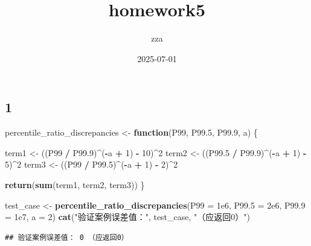 \documentclass[
]{article}
\title{homework5}
\author{zza}
\date{2025-07-01}
\newenvironment{Shaded}{\begin{snugshade}}{\end{snugshade}}
\newcommand{\AttributeTok}[1]{\textcolor[rgb]{0.13,0.29,0.53}{#1}}
\newcommand{\ControlFlowTok}[1]{\textcolor[rgb]{0.13,0.29,0.53}{\textbf{#1}}}
\newcommand{\DecValTok}[1]{\textcolor[rgb]{0.00,0.00,0.81}{#1}}
\newcommand{\FloatTok}[1]{\textcolor[rgb]{0.00,0.00,0.81}{#1}}
\newcommand{\FunctionTok}[1]{\textcolor[rgb]{0.13,0.29,0.53}{\textbf{#1}}}
\newcommand{\NormalTok}[1]{#1}
\newcommand{\OtherTok}[1]{\textcolor[rgb]{0.56,0.35,0.01}{#1}}
\newcommand{\SpecialCharTok}[1]{\textcolor[rgb]{0.81,0.36,0.00}{\textbf{#1}}}
\newcommand{\StringTok}[1]{\textcolor[rgb]{0.31,0.60,0.02}{#1}}
\begin{document}
\maketitle

\subsection{1}\label{section}

\begin{Shaded}
\begin{Highlighting}[]
\NormalTok{percentile\_ratio\_discrepancies }\OtherTok{\textless{}{-}} \ControlFlowTok{function}\NormalTok{(P99, P99}\FloatTok{.5}\NormalTok{, P99}\FloatTok{.9}\NormalTok{, a) \{}
  
\NormalTok{  term1 }\OtherTok{\textless{}{-}}\NormalTok{ ((P99 }\SpecialCharTok{/}\NormalTok{ P99}\FloatTok{.9}\NormalTok{)}\SpecialCharTok{\^{}}\NormalTok{(}\SpecialCharTok{{-}}\NormalTok{a }\SpecialCharTok{+} \DecValTok{1}\NormalTok{) }\SpecialCharTok{{-}} \DecValTok{10}\NormalTok{)}\SpecialCharTok{\^{}}\DecValTok{2}
\NormalTok{  term2 }\OtherTok{\textless{}{-}}\NormalTok{ ((P99}\FloatTok{.5} \SpecialCharTok{/}\NormalTok{ P99}\FloatTok{.9}\NormalTok{)}\SpecialCharTok{\^{}}\NormalTok{(}\SpecialCharTok{{-}}\NormalTok{a }\SpecialCharTok{+} \DecValTok{1}\NormalTok{) }\SpecialCharTok{{-}} \DecValTok{5}\NormalTok{)}\SpecialCharTok{\^{}}\DecValTok{2}
\NormalTok{  term3 }\OtherTok{\textless{}{-}}\NormalTok{ ((P99 }\SpecialCharTok{/}\NormalTok{ P99}\FloatTok{.5}\NormalTok{)}\SpecialCharTok{\^{}}\NormalTok{(}\SpecialCharTok{{-}}\NormalTok{a }\SpecialCharTok{+} \DecValTok{1}\NormalTok{) }\SpecialCharTok{{-}} \DecValTok{2}\NormalTok{)}\SpecialCharTok{\^{}}\DecValTok{2}
  
  
  \FunctionTok{return}\NormalTok{(}\FunctionTok{sum}\NormalTok{(term1, term2, term3))}
\NormalTok{\}}


\NormalTok{test\_case }\OtherTok{\textless{}{-}} \FunctionTok{percentile\_ratio\_discrepancies}\NormalTok{(}\AttributeTok{P99 =} \FloatTok{1e6}\NormalTok{, }\AttributeTok{P99.5 =} \FloatTok{2e6}\NormalTok{, }\AttributeTok{P99.9 =} \FloatTok{1e7}\NormalTok{, }\AttributeTok{a =} \DecValTok{2}\NormalTok{)}
\FunctionTok{cat}\NormalTok{(}\StringTok{"验证案例误差值："}\NormalTok{, test\_case, }\StringTok{"（应返回0）"}\NormalTok{)}
\end{Highlighting}
\end{Shaded}

\begin{verbatim}
## 验证案例误差值： 0 （应返回0）
\end{verbatim}
\end{document}
